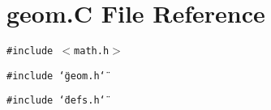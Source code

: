 \section{geom.C File Reference}
\label{geom_8C}
{\tt \#include $<$math.h$>$}\par
{\tt \#include \char`\"{}geom.h\char`\"{}}\par
{\tt \#include \char`\"{}defs.h\char`\"{}}\par
